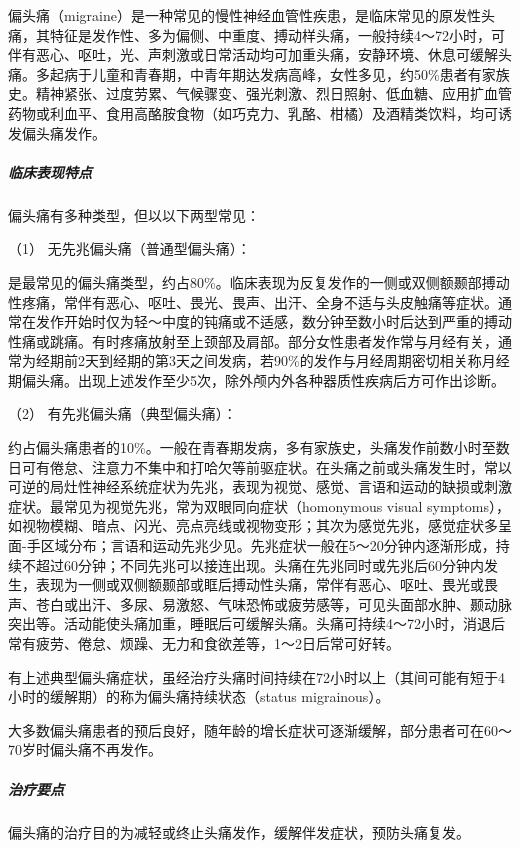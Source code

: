 偏头痛（migraine）是一种常见的慢性神经血管性疾患，是临床常见的原发性头痛，其特征是发作性、多为偏侧、中重度、搏动样头痛，一般持续4～72小时，可伴有恶心、呕吐，光、声刺激或日常活动均可加重头痛，安静环境、休息可缓解头痛。多起病于儿童和青春期，中青年期达发病高峰，女性多见，约50\%患者有家族史。精神紧张、过度劳累、气候骤变、强光刺激、烈日照射、低血糖、应用扩血管药物或利血平、食用高酪胺食物（如巧克力、乳酪、柑橘）及酒精类饮料，均可诱发偏头痛发作。

\subparagraph{临床表现特点}

偏头痛有多种类型，但以以下两型常见：

\hypertarget{text00020.htmlux5cux23CHP1-7-4-1-1-1}{}
（1） 无先兆偏头痛（普通型偏头痛）：

是最常见的偏头痛类型，约占80\%。临床表现为反复发作的一侧或双侧额颞部搏动性疼痛，常伴有恶心、呕吐、畏光、畏声、出汗、全身不适与头皮触痛等症状。通常在发作开始时仅为轻～中度的钝痛或不适感，数分钟至数小时后达到严重的搏动性痛或跳痛。有时疼痛放射至上颈部及肩部。部分女性患者发作常与月经有关，通常为经期前2天到经期的第3天之间发病，若90\%的发作与月经周期密切相关称月经期偏头痛。出现上述发作至少5次，除外颅内外各种器质性疾病后方可作出诊断。

\hypertarget{text00020.htmlux5cux23CHP1-7-4-1-1-2}{}
（2） 有先兆偏头痛（典型偏头痛）：

约占偏头痛患者的10\%。一般在青春期发病，多有家族史，头痛发作前数小时至数日可有倦怠、注意力不集中和打哈欠等前驱症状。在头痛之前或头痛发生时，常以可逆的局灶性神经系统症状为先兆，表现为视觉、感觉、言语和运动的缺损或刺激症状。最常见为视觉先兆，常为双眼同向症状（homonymous
visual
symptoms），如视物模糊、暗点、闪光、亮点亮线或视物变形；其次为感觉先兆，感觉症状多呈面-手区域分布；言语和运动先兆少见。先兆症状一般在5～20分钟内逐渐形成，持续不超过60分钟；不同先兆可以接连出现。头痛在先兆同时或先兆后60分钟内发生，表现为一侧或双侧额颞部或眶后搏动性头痛，常伴有恶心、呕吐、畏光或畏声、苍白或出汗、多尿、易激怒、气味恐怖或疲劳感等，可见头面部水肿、颞动脉突出等。活动能使头痛加重，睡眠后可缓解头痛。头痛可持续4～72小时，消退后常有疲劳、倦怠、烦躁、无力和食欲差等，1～2日后常可好转。

有上述典型偏头痛症状，虽经治疗头痛时间持续在72小时以上（其间可能有短于4小时的缓解期）的称为偏头痛持续状态（status
migrainous）。

大多数偏头痛患者的预后良好，随年龄的增长症状可逐渐缓解，部分患者可在60～70岁时偏头痛不再发作。

\subparagraph{治疗要点}

偏头痛的治疗目的为减轻或终止头痛发作，缓解伴发症状，预防头痛复发。

